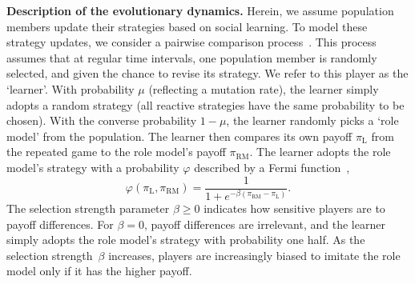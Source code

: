 \documentclass[11pt]{article}
\def\rolemodel{\text{RM}}
\def\learner{\text{L}}
\theoremstyle{plainCl1}
\theoremstyle{plainCl2}
\begin{document}
\noindent
{\bf Description of the evolutionary dynamics.}
Herein, we assume population members update their strategies based on social learning. 
To model these strategy updates, we consider a pairwise comparison process~\citep{traulsen2007pairwise}. 
This process assumes that at regular time intervals, one population member is randomly selected, and given the chance to revise its strategy.
We refer to this player as the `learner'. 
With probability $\mu$ (reflecting a mutation rate), the learner simply adopts a random strategy (all reactive strategies have the same probability to be chosen). 
With the converse probability $1\!-\!\mu$, the learner randomly picks a `role model' from the population. 
The learner then compares its own payoff $\pi_\learner$ from the repeated game to the role model's payoff $\pi_\rolemodel$. 
The learner adopts the role model's strategy with a probability \(\varphi\) described by a Fermi function~\citep{blume:GEB:1995,szabo:PRE:1998}, 
\begin{equation} \label{Eq:rho}
    \varphi\left(\pi_\learner, \pi_\rolemodel\right) = \frac{1}{1\!+\! e^{- \!\beta\left(\pi_\rolemodel- \pi_\learner\right)}}.
\end{equation}
The selection strength parameter $\beta\!\ge\!0$ indicates how sensitive players are to payoff differences. 
For $\beta\!=\!0$, payoff differences are irrelevant, and the learner simply adopts the role model's strategy with probability one half. As the selection strength~$\beta$ increases, players are increasingly biased to imitate the role model only if it has the higher payoff. 

\end{document}
